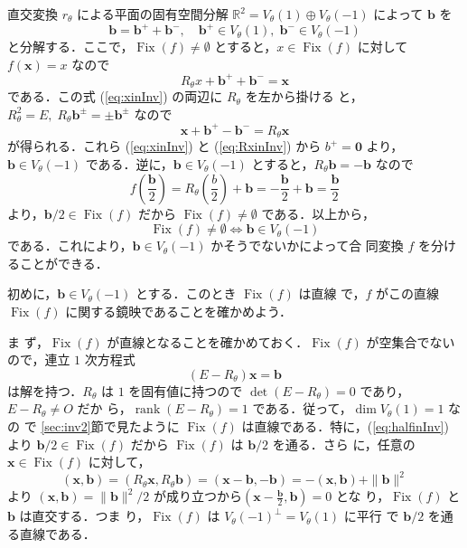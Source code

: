 \documentclass[11pt, uplatex, dvipdfmx, titlepage]{jsarticle}
\DeclareMathOperator{\Fix}{Fix}
\DeclareMathOperator{\rank}{rank}
\theoremstyle{definition}
\begin{document}
直交変換 $r_{\theta}$ による平面の固有空間分解
$\mathbb{R}^2 = V_{\theta}(1) \oplus V_{\theta}(-1)$ によって $\bm{b}$
を
\begin{equation}\label{eq:eigendecomp2}
  \bm{b} = \bm{b}^{+} + \bm{b}^{-}, \quad \bm{b}^{+} \in V_{\theta}(1), \; \bm{b}^{-} \in V_{\theta}(-1)
\end{equation}
と分解する．ここで，$\Fix(f) \neq \emptyset$ とすると，$x \in \Fix(f)$
に対して $f(\bm{x}) = {x}$ なので
\begin{equation}\label{eq:xinInv}
  R_{\theta}x +\bm{b}^{+} + \bm{b}^{-} = \bm{x}
\end{equation}
である．この式 (\ref{eq:xinInv}) の両辺に $R_{\theta}$ を左から掛ける
と，$R_{\theta}^2=E, \; R_{\theta} \bm{b}^{\pm} = \pm \bm{b}^{\pm}$ なので
\begin{equation}\label{eq:RxinInv}
  \bm{x}+\bm{b}^{+}-\bm{b}^{-}=R_{\theta}\bm{x} 
\end{equation}
が得られる．これら (\ref{eq:xinInv}) と (\ref{eq:RxinInv}) から $b^{+}
= \bm{0}$ より，$\bm{b} \in V_{\theta}(-1)$
である．逆に，$\bm{b} \in V_{\theta}(-1)$ とすると，$R_{\theta}\bm{b}
= -\bm{b}$ なので
\begin{equation}\label{eq:halfinInv}
  f\left(\frac{\bm{b}}{2}\right) = R_{\theta}\left(\frac{b}{2}\right) + \bm{b}
  = -\frac{\bm{b}}{2}+\bm{b} = \frac{\bm{b}}{2}
\end{equation}
より，$\bm{b}/2 \in \Fix(f)$ だから $\Fix(f) \neq \emptyset$ である．以上から，
\[
  \Fix(f) \neq \emptyset \Leftrightarrow \bm{b} \in V_{\theta}(-1)
\]
である．これにより，$\bm{b} \in V_{\theta}(-1)$ かそうでないかによって合
同変換 $f$ を分けることができる．


初めに，$\bm{b} \in V_{\theta}(-1)$ とする．このとき $\Fix(f)$ は直線
で，$f$ がこの直線 $\Fix(f)$ に関する鏡映であることを確かめよう．

ま
ず，$\Fix(f)$ が直線となることを確かめておく．$\Fix(f)$ が空集合でない
ので，連立 $1$ 次方程式
\[
  (E-R_{\theta})\bm{x} = \bm{b}
\]
は解を持つ．$R_{\theta}$ は $1$ を固有値に持つので $\det
(E-R_{\theta}) = 0$ であり，$E-R_{\theta} \neq O$ だか
ら，$\rank(E-R_{\theta})=1$ である．従って，$\dim V_{\theta}(1)=1$ なの
で \ref{sec:inv2}節で見たように $\Fix(f)$ は直線である．特に，(\ref{eq:halfinInv})
より $\bm{b}/2 \in \Fix(f)$ だから $\Fix(f)$ は $\bm{b}/2$ を通る．さら
に，任意の $\bm{x} \in \Fix(f)$ に対して，
\[
  (\bm{x}, \bm{b}) = (R_{\theta}\bm{x}, R_{\theta}\bm{b}) =
  (\bm{x}-\bm{b}, -\bm{b}) = -(\bm{x},\bm{b})+\|\bm{b}\|^2
\]
より $(\bm{x}, \bm{b}) = \|\bm{b}\|^2/2$
が成り立つから$\left( \bm{x}-\frac{\bm{b}}{2}, \bm{b}\right) =0$ とな
り，$\Fix(f)$ と $\bm{b}$ は直交する．つま
り，$\Fix(f)$ は $V_{\theta}(-1)^{\perp}=V_{\theta}(1)$ に平行
で $\bm{b}/2$ を通る直線である．
\end{document}
